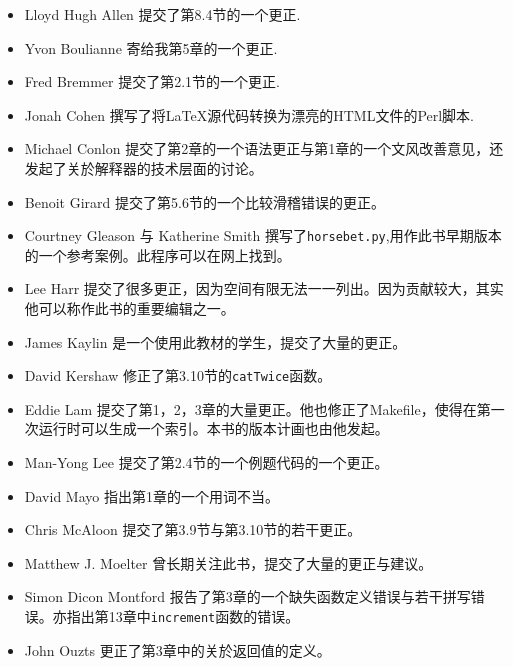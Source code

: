 \begin{itemize}

\item Lloyd Hugh Allen 提交了第8.4节的一个更正.

\item Yvon Boulianne 寄给我第5章的一个更正.

\item Fred Bremmer 提交了第2.1节的一个更正.

\item Jonah Cohen 撰写了将LaTeX源代码转换为漂亮的HTML文件的Perl脚本.

\item Michael Conlon 提交了第2章的一个语法更正与第1章的一个文风改善意见，还发起了关於解释器的技术层面的讨论。

\item Benoit Girard 提交了第5.6节的一个比较滑稽错误的更正。

\item Courtney Gleason 与 Katherine Smith 撰写了{\tt horsebet.py},用作此书早期版本的一个参考案例。此程序可以在网上找到。

\item Lee Harr 提交了很多更正，因为空间有限无法一一列出。因为贡献较大，其实他可以称作此书的重要编辑之一。

\item James Kaylin 是一个使用此教材的学生，提交了大量的更正。

\item David Kershaw 修正了第3.10节的{\tt catTwice}函数。

\item Eddie Lam 提交了第1，2，3章的大量更正。他也修正了Makefile，使得在第一次运行时可以生成一个索引。本书的版本计画也由他发起。

\item Man-Yong Lee 提交了第2.4节的一个例题代码的一个更正。

\item David Mayo 指出第1章的一个用词不当。

\item Chris McAloon 提交了第3.9节与第3.10节的若干更正。

\item Matthew J. Moelter 曾长期关注此书，提交了大量的更正与建议。

\item Simon Dicon Montford 报告了第3章的一个缺失函数定义错误与若干拼写错误。亦指出第13章中{\tt increment}函数的错误。

\item John Ouzts 更正了第3章中的关於返回值的定义。


\end{itemize}
